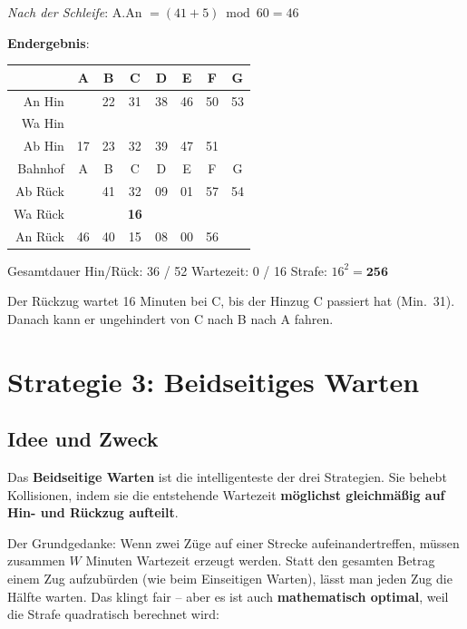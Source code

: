 \documentclass[12pt,a4paper]{article}
\begin{document}
\begin{beispielbox}[title={Einseitiges Warten -- Beispiel2: A--B--C--D--E--F--G, Abstände: 5 8 6 7 3 2, Start: 17}]
\textit{Nach der Schleife}: A.An $= (41+5)\bmod60 = 46$

\textbf{Endergebnis}:
\begin{center}
\begin{tabular}{r|ccccccc}
 & A & B & C & D & E & F & G \\
\hline
An Hin  &    & 22 & 31 & 38 & 46 & 50 & 53 \\
Wa Hin  &    &    &    &    &    &    &    \\
Ab Hin  & 17 & 23 & 32 & 39 & 47 & 51 &    \\
\hline
Bahnhof & A  & B  & C  & D  & E  & F  & G  \\
\hline
Ab Rück &    & 41 & 32 & 09 & 01 & 57 & 54 \\
Wa Rück &    &    & \textbf{16} &    &    &    &    \\
An Rück & 46 & 40 & 15 & 08 & 00 & 56 &    \\
\end{tabular}
\end{center}

Gesamtdauer Hin/Rück: 36 / 52 \quad Wartezeit: 0 / 16 \quad Strafe: $16^2 = \mathbf{256}$

Der Rückzug wartet 16 Minuten bei C, bis der Hinzug C passiert hat (Min.~31). Danach kann er ungehindert von C nach B nach A fahren.
\end{beispielbox}

\section{Strategie 3: Beidseitiges Warten}

\subsection{Idee und Zweck}

Das \textbf{Beidseitige Warten} ist die intelligenteste der drei Strategien. Sie behebt Kollisionen, indem sie die entstehende Wartezeit \textbf{möglichst gleichmäßig auf Hin- und Rückzug aufteilt}.

Der Grundgedanke: Wenn zwei Züge auf einer Strecke aufeinandertreffen, müssen zusammen $W$ Minuten Wartezeit erzeugt werden. Statt den gesamten Betrag einem Zug aufzubürden (wie beim Einseitigen Warten), lässt man jeden Zug die Hälfte warten. Das klingt fair -- aber es ist auch \textbf{mathematisch optimal}, weil die Strafe quadratisch berechnet wird:
\end{document}
